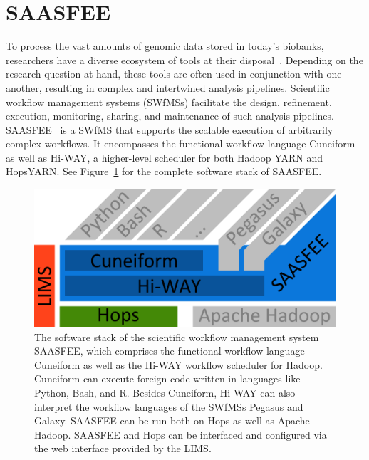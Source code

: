 \section{SAASFEE}
\label{saasfee}


To process the vast amounts of genomic data stored in today's biobanks, researchers have a diverse ecosystem of tools at their disposal~\cite{Pabinger2014}. Depending on the research question at hand, these tools are often used in conjunction with one another, resulting in complex and intertwined analysis pipelines. Scientific workflow management systems (SWfMSs) facilitate the design, refinement, execution, monitoring, sharing, and maintenance of such analysis pipelines. SAASFEE~\cite{vldb_demo} is a SWfMS that supports the scalable execution of arbitrarily complex workflows. It encompasses the functional workflow language Cuneiform as well as Hi-WAY, a higher-level scheduler for both Hadoop YARN and HopsYARN. See Figure~\ref{fig:saasfee_stack} for the complete software stack of SAASFEE.

\begin{figure}
  \centering
  \includegraphics[width=.6\textwidth]{imgs/saasfee_stack.pdf}
  \caption{The software stack of the scientific workflow management system SAASFEE, which comprises the functional workflow language Cuneiform as well as the Hi-WAY workflow scheduler for Hadoop. Cuneiform can execute foreign code written in languages like Python, Bash, and R. Besides Cuneiform, Hi-WAY can also interpret the workflow languages of the SWfMSs Pegasus and Galaxy. SAASFEE can be run both on Hops as well as Apache Hadoop. SAASFEE and Hops can be interfaced and configured via the web interface provided by the LIMS.}
  \label{fig:saasfee_stack}
\end{figure}

